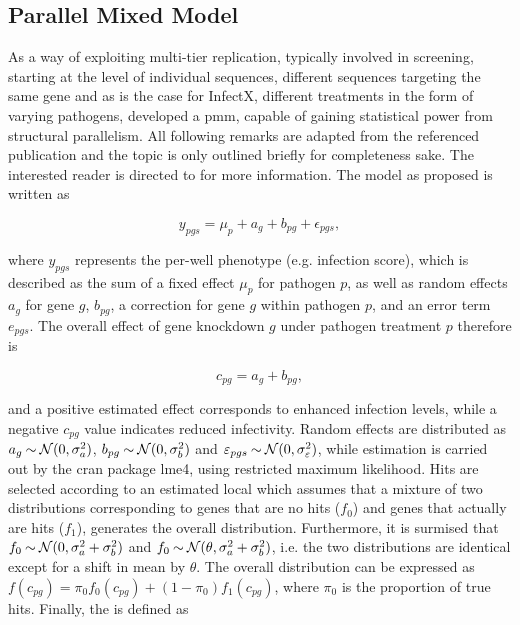 \subsection{Parallel Mixed Model}
As a way of exploiting multi-tier replication, typically involved in  screening, starting at the level of individual sequences, different sequences targeting the same gene and as is the case for InfectX, different treatments in the form of varying pathogens, \citeauthor{Ramo2014} developed a \acrfull{pmm}, capable of gaining statistical power from structural parallelism. All following remarks are adapted from the referenced publication and the topic is only outlined briefly for completeness sake. The interested reader is directed to \citet{Ramo2014} for more information. The model as proposed is written as

\begin{equation}
  y_{pgs} = \mu_p + a_g + b_{pg} + \epsilon_{pgs},
\end{equation}

where $y_{pgs}$ represents the per-well phenotype (e.g. infection score), which is described as the sum of a fixed effect $\mu_p$ for pathogen $p$, as well as random effects $a_g$ for gene $g$, $b_{pg}$, a correction for gene $g$ within pathogen $p$, and an error term $e_{pgs}$. The overall effect of gene knockdown $g$ under pathogen treatment $p$ therefore is 

\begin{equation}
  c_{pg} = a_g + b_{pg},
\end{equation}

and a positive estimated effect corresponds to enhanced infection levels, while a negative $c_{pg}$ value indicates reduced infectivity. Random effects are distributed as $a_g \mathbin{\sim} \operatorname{\mathcal{N}}(0, \sigma_a^2)$, $b_{pg} \mathbin{\sim} \operatorname{\mathcal{N}}(0, \sigma_b^2)$ and $\varepsilon_{pgs} \mathbin{\sim} \operatorname{\mathcal{N}}(0, \sigma_\varepsilon^2)$, while estimation is carried out by the \acrshort{cran} package lme4, using restricted maximum likelihood. Hits are selected according to an estimated local  which assumes that a mixture of two distributions corresponding to genes that are no hits ($f_0$) and genes that actually are hits ($f_1$), generates the overall distribution. Furthermore, it is surmised that $f_0 \mathbin{\sim} \operatorname{\mathcal{N}}(0, \sigma_a^2+\sigma_b^2)$ and $f_0 \mathbin{\sim} \operatorname{\mathcal{N}}(\theta, \sigma_a^2+\sigma_b^2)$, i.e. the two distributions are identical except for a shift in mean by $\theta$. The overall distribution can be expressed as $f(c_{pg}) = \pi_0 f_0(c_{pg}) + (1-\pi_0) f_1(c_{pg})$, where $\pi_0$ is the proportion of true hits. Finally, the  is defined as


